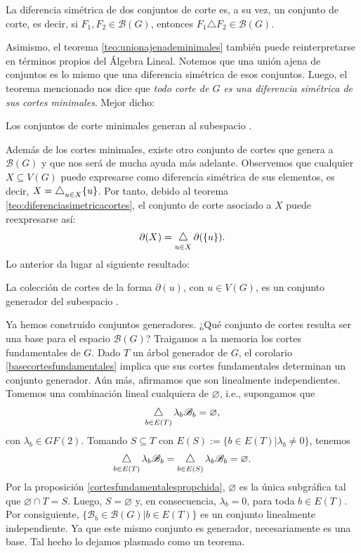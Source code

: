 \begin{teo} \label{teo:difsimcortes}
La diferencia simétrica de dos conjuntos de corte es, a su vez, un conjunto de corte, es decir, si $F_{1}, F_{2} \in \mathcal{B}(G)$, entonces $F_{1} \triangle F_{2} \in \mathcal{B}(G)$.
\end{teo}

Asimismo, el teorema \ref{teo:unionajenademinimales} también puede reinterpretarse en términos propios del Álgebra Lineal. Notemos que una unión ajena de conjuntos es lo mismo que una diferencia simétrica de esos conjuntos. Luego, el teorema mencionado nos dice que \textit{todo corte de $G$ es una diferencia simétrica de sus cortes minimales}. Mejor dicho:

\begin{teo}
Los conjuntos de corte minimales generan al subespacio \bondt.
\end{teo}


Además de los cortes minimales, existe otro conjunto de cortes que genera a $\mathcal{B}(G)$ y que nos será de mucha ayuda más adelante. Observemos que cualquier $X \subseteq V(G)$ puede expresarse como diferencia simétrica de sus elementos, es decir, $X = \difsym_{u \in X} \{u\}$. Por tanto, debido al teorema \ref{teo:diferenciasimetricacortes}, el conjunto de corte asociado a $X$ puede reexpresarse así:
$$
\partial(X) = \difsym_{u \in X} \partial(\{u\}).
$$
Lo anterior da lugar al siguiente resultado:

\begin{prop} \label{prop:incidenceset}
La colección de cortes de la forma $\partial(u)$, con $u \in V(G)$, es un conjunto generador del subespacio \bondt.
\end{prop}

Ya hemos construido conjuntos generadores. ¿Qué conjunto de cortes resulta ser una base para el espacio $\mathcal{B}(G)$? Traigamos a la memoria los cortes fundamentales de $G$. Dado $T$ un árbol generador de $G$, el corolario \ref{basecortesfundamentales} implica que sus cortes fundamentales determinan un conjunto generador. Aún más, afirmamos que son linealmente independientes. Tomemos una combinación lineal cualquiera de $\varnothing$, i.e., supongamos que  
$$
\difsym_{b \in E(T)} \lambda_{b}\mathscr{B}_{b} = \varnothing,
$$
con $\lambda_{b} \in GF(2)$. Tomando $S\subseteq T$ con $E(S):=\{b \in E(T) | \lambda_{b} \neq 0\}$, tenemos
$$
\difsym_{b \in E(T)} \lambda_{b}\mathscr{B}_{b} = \difsym_{b \in E(S)} \lambda_{b}\mathscr{B}_{b}= \varnothing.
$$
Por la proposición \ref{cortesfundamentalespropchida},  $\varnothing$ es la única subgráfica tal que $\varnothing \cap T = S$. Luego, $S = \varnothing$ y, en consecuencia, $\lambda_{b}=0$, para toda $b\in E(T)$. Por consiguiente, $\{\mathscr{B}_{b} \in \mathcal{B}(G) | b\in E(T)\}$ es un conjunto linealmente independiente. Ya que este mismo conjunto es generador,  necesariamente es una base. Tal hecho lo dejamos plasmado como un teorema.


